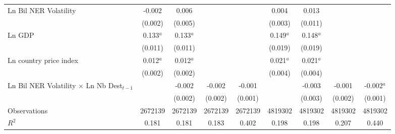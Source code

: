\documentclass[11pt,twoside, authoryear]{elsarticle}
\begin{document}
\begin{landscape}
\begin{table}[htbp]
\begin{threeparttable}
\begin{tabular}{l*{8}{c}}
Ln Bil NER Volatility                 &      -0.002      &       0.006      &                  &                  &       0.004      &       0.013      &                  &                  \\
                    &     (0.002)      &     (0.005)      &                  &                  &     (0.003)      &     (0.011)      &                  &                  \\
[1em]
Ln GDP              &       0.133{$^a$}&       0.133{$^a$}&                  &                  &       0.149{$^a$}&       0.148{$^a$}&                  &                  \\
                    &     (0.011)      &     (0.011)      &                  &                  &     (0.019)      &     (0.019)      &                  &                  \\
[1em]
Ln country price index&       0.012{$^a$}&       0.012{$^a$}&                  &                  &       0.021{$^a$}&       0.021{$^a$}&                  &                  \\
                    &     (0.002)      &     (0.002)      &                  &                  &     (0.004)      &     (0.004)      &                  &                  \\
[1em]
Ln Bil NER Volatility $\times$ Ln Nb Dest$_{t-1}$          &                  &      -0.002      &      -0.002      &      -0.001      &                  &      -0.003      &      -0.001      &      -0.002{$^a$}\\
                    &                  &     (0.002)      &     (0.002)      &     (0.001)      &                  &     (0.003)      &     (0.002)      &     (0.001)      \\
\hline
Observations        &     2672139      &     2672139      &     2672139      &     2672139      &     4819302      &     4819302      &     4819302      &     4819302      \\
\(R^{2}\)           &       0.181      &       0.181      &       0.183      &       0.402      &       0.198      &       0.198      &       0.207      &       0.440      \\


\end{tabular}
\end{threeparttable}
\end{table}
\end{landscape}
\end{document}

